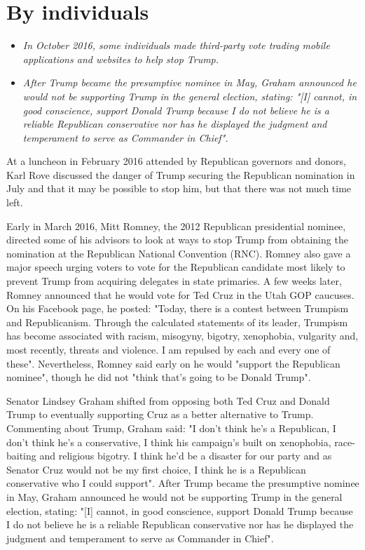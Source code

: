 \section{By individuals}\label{by-individuals}

\begin{itemize}
\item
  \emph{In October 2016, some individuals made third-party vote trading
  mobile applications and websites to help stop Trump.}
\item
  \emph{After Trump became the presumptive nominee in May, Graham
  announced he would not be supporting Trump in the general election,
  stating: "{[}I{]} cannot, in good conscience, support Donald Trump
  because I do not believe he is a reliable Republican conservative nor
  has he displayed the judgment and temperament to serve as Commander in
  Chief".}
\end{itemize}

At a luncheon in February 2016 attended by Republican governors and
donors, Karl Rove discussed the danger of Trump securing the Republican
nomination in July and that it may be possible to stop him, but that
there was not much time left.

Early in March 2016, Mitt Romney, the 2012 Republican presidential
nominee, directed some of his advisors to look at ways to stop Trump
from obtaining the nomination at the Republican National Convention
(RNC). Romney also gave a major speech urging voters to vote for the
Republican candidate most likely to prevent Trump from acquiring
delegates in state primaries. A few weeks later, Romney announced that
he would vote for Ted Cruz in the Utah GOP caucuses. On his Facebook
page, he posted: "Today, there is a contest between Trumpism and
Republicanism. Through the calculated statements of its leader, Trumpism
has become associated with racism, misogyny, bigotry, xenophobia,
vulgarity and, most recently, threats and violence. I am repulsed by
each and every one of these". Nevertheless, Romney said early on he
would "support the Republican nominee", though he did not "think that's
going to be Donald Trump".

Senator Lindsey Graham shifted from opposing both Ted Cruz and Donald
Trump to eventually supporting Cruz as a better alternative to Trump.
Commenting about Trump, Graham said: "I don't think he's a Republican, I
don't think he's a conservative, I think his campaign's built on
xenophobia, race-baiting and religious bigotry. I think he'd be a
disaster for our party and as Senator Cruz would not be my first choice,
I think he is a Republican conservative who I could support". After
Trump became the presumptive nominee in May, Graham announced he would
not be supporting Trump in the general election, stating: "{[}I{]}
cannot, in good conscience, support Donald Trump because I do not
believe he is a reliable Republican conservative nor has he displayed
the judgment and temperament to serve as Commander in Chief".

